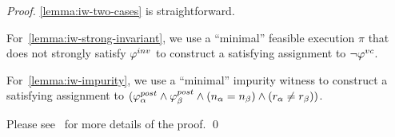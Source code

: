 \begin{proof}

\ref{lemma:iw-two-cases} is straightforward.

For~\ref{lemma:iw-strong-invariant}, we use a ``minimal'' feasible execution $\pi$ that does not strongly satisfy $\varphi^{inv}$
to construct a satisfying assignment to $\neg \varphi^{vc}$.

For~\ref{lemma:iw-impurity}, we use a ``minimal'' impurity witness to construct a satisfying assignment to
$(\varphi^{post}_\alpha \wedge \varphi^{post}_\beta \wedge (n_\alpha = n_\beta) \wedge (r_\alpha \neq r_\beta))$.

Please see~\cite{CheckingOP:arxiv} for more details of the proof.
\qed

%
%
\end{proof}
